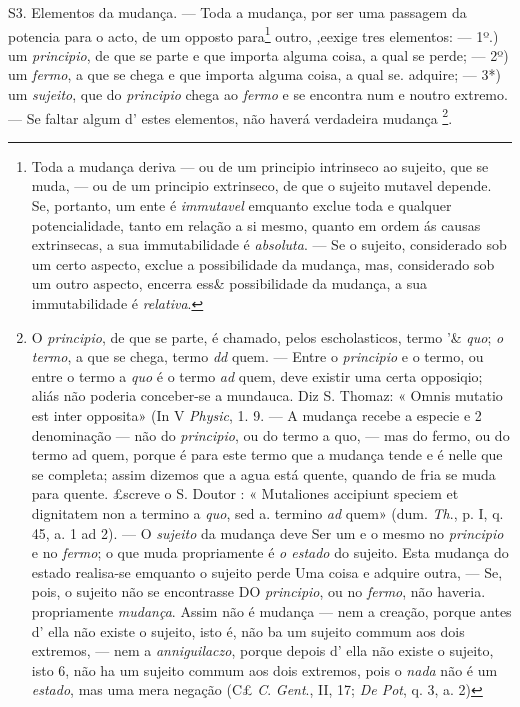 S3. Elementos da mudança. --- Toda a mudança, por ser uma passagem da potencia para o acto, de um opposto para\footnote{Toda a mudança deriva --- ou de um principio intrinseco ao sujeito, que se muda, --- ou de um principio extrinseco, de que o sujeito mutavel depende. Se, portanto, um ente é \emph{immutavel} emquanto exclue toda e qualquer potencialidade, tanto em relação a si mesmo, quanto em ordem ás causas extrinsecas, a sua immutabilidade é \emph{absoluta}. --- Se o sujeito, considerado sob um certo aspecto, exclue a possibilidade da mudança, mas, considerado sob um outro aspecto, encerra ess\& possibilidade da mudança, a sua immutabilidade é \emph{relativa}.}   outro, ,eexige tres elementos: --- 1º.) um \emph{principio}, de que se parte e que importa alguma coisa, a qual se perde; --- 2º) um \emph{fermo}, a que se chega e que importa alguma coisa, a qual se. adquire; --- 3*) um \emph{sujeito}, que do \emph{principio} chega ao \emph{fermo} e se encontra num e noutro extremo. --- Se faltar algum d' estes elementos, não haverá verdadeira mudança \footnote{O \emph{principio}, de que se parte, é chamado, pelos escholasticos, termo '\& \emph{quo}; \emph{o termo}, a que se chega, termo \emph{dd} quem. --- Entre o \emph{principio} e o termo, ou entre o termo a \emph{quo} é o termo \emph{ad} quem, deve existir uma certa opposiqio; aliás não poderia conceber-se a mundauca. Diz S. Thomaz: « Omnis mutatio est inter opposita» (In V \emph{Physic}, 1. 9. --- A mudança recebe a especie e 2 denominação --- não do \emph{principio}, ou do termo a quo, --- mas do fermo, ou do termo ad quem, porque é para este termo que a mudança tende e é nelle que se completa; assim dizemos que a agua está quente, quando de fria se muda para quente. £screve o S. Doutor : « Mutaliones accipiunt speciem et dignitatem non a termino a \emph{quo}, sed a. termino \emph{ad} quem» (dum. \emph{Th}., p. I, q. 45, a. 1 ad 2). --- O \emph{sujeito} da mudança deve Ser um e o mesmo no \emph{principio} e no \emph{fermo}; o que muda propriamente é \emph{o estado} do sujeito. Esta mudança do estado realisa-se emquanto o sujeito perde Uma coisa e adquire outra, --- Se, pois, o sujeito não se encontrasse DO \emph{principio}, ou no \emph{fermo}, não haveria. propriamente \emph{mudança}. Assim não é mudança --- nem a creação, porque antes d' ella não existe o sujeito, isto é, não ba um sujeito commum aos dois extremos, --- nem a \emph{anniguilaczo}, porque depois d' ella não existe o sujeito, isto 6, não ha um sujeito commum aos dois extremos, pois o \emph{nada} não é um \emph{estado}, mas uma mera negação (C£ \emph{C}. \emph{Gent}., II, 17; \emph{De Pot}, q. 3, a. 2)}.

